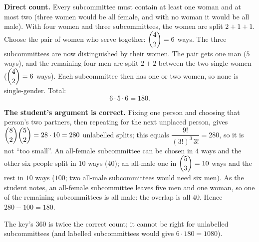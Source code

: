 \textbf{Direct count.} Every subcommittee must contain at least one woman and at most two (three women would be all female, and with no woman it would be all male). With four women and three subcommittees, the women are split $2+1+1$. Choose the pair of women who serve together: $\dbinom42=6$ ways. The three subcommittees are now distinguished by their women. The pair gets one man ($5$ ways), and the remaining four men are split $2+2$ between the two single women ($\dbinom42=6$ ways). Each subcommittee then has one or two women, so none is single-gender. Total:
\[
6\cdot5\cdot6=\boxed{180}.
\]

\textbf{The student's argument is correct.} Fixing one person and choosing that person's two partners, then repeating for the next unplaced person, gives $\dbinom82\dbinom52=28\cdot10=280$ unlabelled splits; this equals $\dfrac{9!}{(3!)^3\,3!}=280$, so it is not ``too small''. An all-female subcommittee can be chosen in $4$ ways and the other six people split in $10$ ways ($40$); an all-male one in $\dbinom53=10$ ways and the rest in $10$ ways ($100$; two all-male subcommittees would need six men). As the student notes, an all-female subcommittee leaves five men and one woman, so one of the remaining subcommittees is all male: the overlap is all $40$. Hence $280-100=180$.

The key's $360$ is twice the correct count; it cannot be right for unlabelled subcommittees (and labelled subcommittees would give $6\cdot180=1080$).
